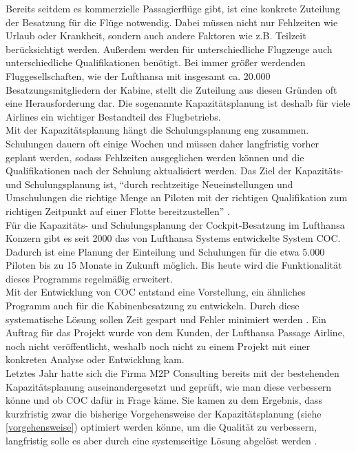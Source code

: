 \documentclass [12pt, a4paper, oneside, titlepage, ngerman]{article}
\begin{document}
Bereits seitdem es kommerzielle Passagierflüge gibt, ist eine konkrete Zuteilung der Besatzung für die Flüge notwendig. Dabei müssen nicht nur Fehlzeiten wie Urlaub oder Krankheit, sondern auch andere Faktoren wie z.B. Teilzeit berücksichtigt werden. Außerdem werden für unterschiedliche Flugzeuge auch unterschiedliche Qualifikationen benötigt. Bei immer größer werdenden Fluggesellschaften, wie der Lufthansa mit insgesamt ca. 20.000 Besatzungsmitgliedern der Kabine, stellt die Zuteilung aus diesen Gründen oft eine Herausforderung dar. Die sogenannte Kapazitätsplanung ist deshalb für viele Airlines ein wichtiger Bestandteil des Flugbetriebs. \\
Mit der Kapazitätsplanung hängt die Schulungsplanung eng zusammen. Schulungen dauern oft einige Wochen und müssen daher langfristig vorher geplant werden, sodass Fehlzeiten ausgeglichen werden können und die Qualifikationen nach der Schulung aktualisiert werden. Das Ziel der Kapazitäts- und Schulungsplanung ist, "`durch rechtzeitige Neueinstellungen und Umschulungen die richtige Menge an Piloten mit der richtigen Qualifikation zum richtigen Zeitpunkt auf einer Flotte bereitzustellen"' \cite[vgl.][S.19]{compasdoku}. \\

\noindent Für die Kapazitäts- und Schulungsplanung der Cockpit-Besatzung im Lufthansa Konzern gibt es seit 2000 das von Lufthansa Systems entwickelte System \ac{COC}. Dadurch ist eine Planung der Einteilung und Schulungen für die etwa 5.000 Piloten bis zu 15 Monate in Zukunft möglich. Bis heute wird die Funktionalität dieses Programms regelmäßig erweitert.  \\
Mit der Entwicklung von \ac{COC} entstand eine Vorstellung, ein ähnliches Programm auch für die Kabinenbesatzung zu entwickeln. Durch diese systematische Lösung sollen Zeit gespart und Fehler minimiert werden \cite[vgl.][S.4]{highlevelitems}. Ein Auftrag für das Projekt wurde von dem Kunden, der Lufthansa Passage Airline, noch nicht veröffentlicht, weshalb noch nicht zu einem Projekt mit einer konkreten Analyse oder Entwicklung kam.  \\

\noindent Letztes Jahr hatte sich die Firma M2P Consulting bereits mit der bestehenden Kapazitätsplanung auseinandergesetzt und geprüft, wie man diese verbessern könne und ob \ac{COC} dafür in Frage käme. Sie kamen zu dem Ergebnis, dass kurzfristig zwar die bisherige Vorgehensweise der Kapazitätsplanung (siehe \ref{vorgehensweise}) optimiert werden könne, um die Qualität zu verbessern, langfristig solle es aber durch eine systemseitige Lösung abgelöst werden \cite [vgl.][S.8-10]{M2P}. %
\end{document}
